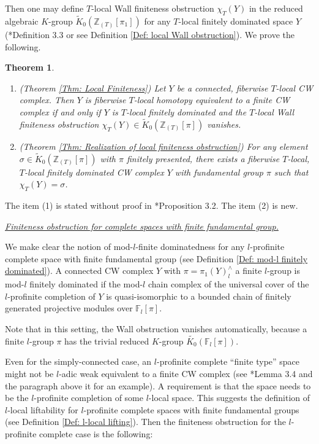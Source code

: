 \documentclass[11pt]{amsart}
\newtheorem{theorem}{Theorem}[section]
\theoremstyle{definition}
\numberwithin{equation}{section}
\numberwithin{equation}{section}
\newcommand\ZZ{\mathbb{Z}}
\newcommand\FF{\mathbb{F}}
\begin{document}
Then one may define $T$-local Wall finiteness obstruction $\chi_T(Y)$ in the reduced algebraic $K$-group $\widetilde{K}_0(\ZZ_{(T)}[\pi_1])$ for any $T$-local finitely dominated space $Y$  (\cite{local-finiteness}*{Definition 3.3} or see Definition \ref{Def: local Wall obstruction}). We prove the following.

\begin{theorem}
\begin{enumerate}
    \item (Theorem \ref{Thm: Local Finiteness}) Let $Y$ be a connected, fiberwise $T$-local CW complex. Then $Y$ is fiberwise $T$-local homotopy equivalent to a finite CW complex if and only if $Y$ is $T$-local finitely dominated and the $T$-local Wall finiteness obstruction $\chi_{T}(Y)\in \widetilde{K}_0(\ZZ_{(T)}[\pi])$ vanishes.
    \item (Theorem \ref{Thm: Realization of local finiteness obstruction}) For any element $\sigma\in\widetilde{K}_0(\ZZ_{(T)}[\pi])$ with $\pi$ finitely presented, there exists a fiberwise $T$-local, $T$-local finitely dominated CW complex $Y$ with fundamental group $\pi$ such that $\chi_{T}(Y)=\sigma$.
\end{enumerate}
\end{theorem}

The item (1) is stated without proof in \cite{local-finiteness}*{Proposition 3.2}.
The item (2) is new.

\underline{\textit{Finiteness obstruction for complete spaces with finite fundamental group.}}

We make clear the notion of mod-$l$-finite dominatedness for any $l$-profinite complete space with finite fundamental group (see Definition \ref{Def: mod-l finitely dominated}). A connected CW complex $Y$ with $\pi=\pi_1(Y)^{\wedge}_l$ a finite $l$-group is mod-$l$ finitely dominated if the mod-$l$ chain complex of the universal cover of the $l$-profinite completion of $Y$ is quasi-isomorphic to a bounded chain of finitely generated projective modules over $\FF_l [\pi]$.

Note that in this setting, the Wall obstruction vanishes automatically, because a finite $l$-group $\pi$ has the trivial reduced $K$-group $\widetilde{K_0}(\FF_l[\pi])$.

Even for the simply-connected case, an $l$-profinite complete ``finite type'' space might not be $l$-adic weak equivalent to a finite CW complex (see \cite{Victor-Wilkerson-Counterexample-p-completion}*{Lemma 3.4 and the paragraph above
it} for an example). A requirement is that the space needs to be the $l$-profinite completion of some $l$-local space. This suggests the definition of $l$-local liftability for $l$-profinite complete spaces with finite fundamental groups (see Definition \ref{Def: l-local lifting}). Then the finiteness obstruction for the $l$-profinite complete case is the following:
\end{document}
